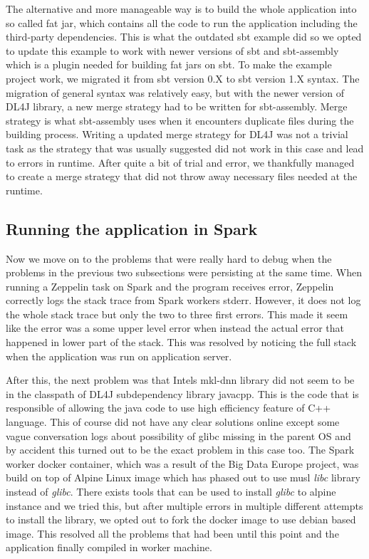 The alternative and more manageable way is to build the whole application into so called fat jar, which contains all the code to run the application including the third-party dependencies.
This is what the outdated sbt example did so we opted to update this example to work with newer versions of sbt and sbt-assembly which is a plugin needed for building fat jars on sbt.
To make the example project work, we migrated it from sbt version 0.X to sbt version 1.X syntax. 
The migration of general syntax was relatively easy, but with the newer version of DL4J library, a new merge strategy had to be written for sbt-assembly.
Merge strategy is what sbt-assembly uses when it encounters duplicate files during the building process.
Writing a updated merge strategy for DL4J was not a trivial task as the strategy that was usually suggested did not work in this case and lead to errors in runtime.
After quite a bit of trial and error, we thankfully managed to create a merge strategy that did not throw away necessary files needed at the runtime.

\subsection{Running the application in Spark}

Now we move on to the problems that were really hard to debug when the problems in the previous two subsections were persisting at the same time.
When running a Zeppelin task on Spark and the program receives error, Zeppelin correctly logs the stack trace from Spark workers stderr.
However, it does not log the whole stack trace but only the two to three first errors.
This made it seem like the error was a some upper level error when instead the actual error that happened in lower part of the stack.
This was resolved by noticing the full stack when the application was run on application server.

After this, the next problem was that Intels mkl-dnn library did not seem to be in the classpath of DL4J subdependency library javacpp.
This is the code that is responsible of allowing the java code to use high efficiency feature of C++ language.
This of course did not have any clear solutions online except some vague conversation logs about possibility of glibc missing in the parent OS and by accident this turned out to be the exact problem in this case too.
The Spark worker docker container, which was a result of the Big Data Europe project, was build on top of Alpine Linux image which has phased out to use musl \emph{libc} library instead of \emph{glibc}.
There exists tools that can be used to install \emph{glibc} to alpine instance and we tried this, but after multiple errors in multiple different attempts to install the library, we opted out to fork the docker image to use debian based image.
This resolved all the problems that had been until this point and the application finally compiled in worker machine.


